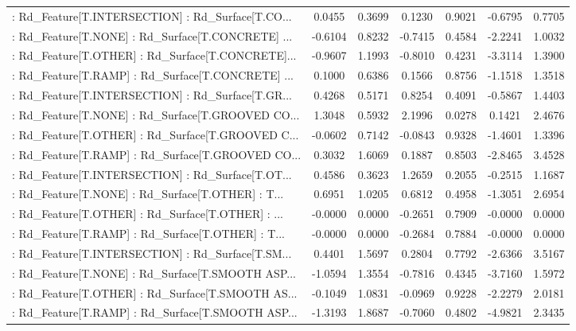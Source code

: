 \begin{longtable}{p{4cm}cccccc}
 : Rd\_Feature[T.INTERSECTION] : Rd\_Surface[T.CO... &  0.0455 &    0.3699 &  0.1230 &       0.9021 & -0.6795 &  0.7705 \\
 : Rd\_Feature[T.NONE] : Rd\_Surface[T.CONCRETE] ... & -0.6104 &    0.8232 & -0.7415 &       0.4584 & -2.2241 &  1.0032 \\
 : Rd\_Feature[T.OTHER] : Rd\_Surface[T.CONCRETE]... & -0.9607 &    1.1993 & -0.8010 &       0.4231 & -3.3114 &  1.3900 \\
 : Rd\_Feature[T.RAMP] : Rd\_Surface[T.CONCRETE] ... &  0.1000 &    0.6386 &  0.1566 &       0.8756 & -1.1518 &  1.3518 \\
 : Rd\_Feature[T.INTERSECTION] : Rd\_Surface[T.GR... &  0.4268 &    0.5171 &  0.8254 &       0.4091 & -0.5867 &  1.4403 \\
 : Rd\_Feature[T.NONE] : Rd\_Surface[T.GROOVED CO... &  1.3048 &    0.5932 &  2.1996 &       0.0278 &  0.1421 &  2.4676 \\
 : Rd\_Feature[T.OTHER] : Rd\_Surface[T.GROOVED C... & -0.0602 &    0.7142 & -0.0843 &       0.9328 & -1.4601 &  1.3396 \\
 : Rd\_Feature[T.RAMP] : Rd\_Surface[T.GROOVED CO... &  0.3032 &    1.6069 &  0.1887 &       0.8503 & -2.8465 &  3.4528 \\
 : Rd\_Feature[T.INTERSECTION] : Rd\_Surface[T.OT... &  0.4586 &    0.3623 &  1.2659 &       0.2055 & -0.2515 &  1.1687 \\
 : Rd\_Feature[T.NONE] : Rd\_Surface[T.OTHER] : T... &  0.6951 &    1.0205 &  0.6812 &       0.4958 & -1.3051 &  2.6954 \\
 : Rd\_Feature[T.OTHER] : Rd\_Surface[T.OTHER] : ... & -0.0000 &    0.0000 & -0.2651 &       0.7909 & -0.0000 &  0.0000 \\
 : Rd\_Feature[T.RAMP] : Rd\_Surface[T.OTHER] : T... & -0.0000 &    0.0000 & -0.2684 &       0.7884 & -0.0000 &  0.0000 \\
 : Rd\_Feature[T.INTERSECTION] : Rd\_Surface[T.SM... &  0.4401 &    1.5697 &  0.2804 &       0.7792 & -2.6366 &  3.5167 \\
 : Rd\_Feature[T.NONE] : Rd\_Surface[T.SMOOTH ASP... & -1.0594 &    1.3554 & -0.7816 &       0.4345 & -3.7160 &  1.5972 \\
 : Rd\_Feature[T.OTHER] : Rd\_Surface[T.SMOOTH AS... & -0.1049 &    1.0831 & -0.0969 &       0.9228 & -2.2279 &  2.0181 \\
 : Rd\_Feature[T.RAMP] : Rd\_Surface[T.SMOOTH ASP... & -1.3193 &    1.8687 & -0.7060 &       0.4802 & -4.9821 &  2.3435 \\

\end{longtable}
